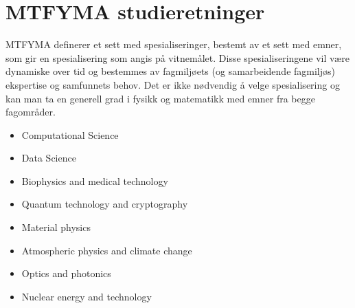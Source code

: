 \chapter{MTFYMA studieretninger}
\label{c:mtfyma-spec}

MTFYMA definerer et sett med spesialiseringer, bestemt av et sett med emner, som gir en spesialisering som angis på vitnemålet. Disse spesialiseringene vil være dynamiske over tid og bestemmes av fagmiljøets (og samarbeidende fagmiljøs) ekspertise og samfunnets behov. Det er ikke nødvendig å velge spesialisering og kan man ta en generell grad i fysikk og matematikk med emner fra begge fagområder.

\begin{itemize}
	\item Computational Science
	\item Data Science
	\item Biophysics and medical technology
	\item Quantum technology and cryptography
	\item Material physics
	\item Atmospheric physics and climate change
	\item Optics and photonics
	\item Nuclear energy and technology
\end{itemize}
